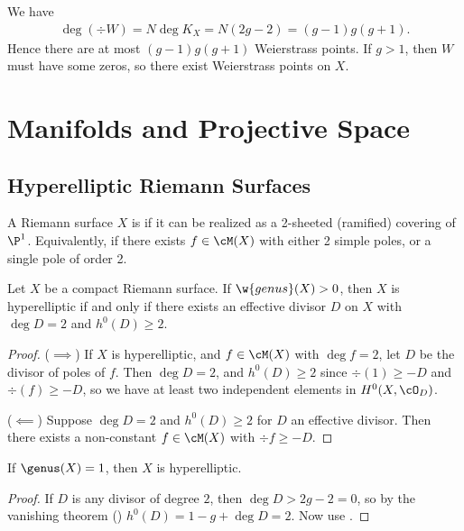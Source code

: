 \documentclass[11pt]{report}
\begin{document}
\begin{rmk} \label{rmk:g-more-1-implies-wp}
We have
\begin{align*}
\deg (\div W)=N\deg K_X = N(2g-2) = (g-1)g(g+1).
\end{align*}
Hence there are at most $(g-1)g(g+1)$ Weierstrass points. If $g>1$, then $W$ must have some zeros, so there exist Weierstrass points on $X$.
\end{rmk}

\chapter{Manifolds and Projective Space}

\section{Hyperelliptic Riemann Surfaces}

\begin{defn}
A Riemann surface $X$ is  if it can be realized as a 2-sheeted (ramified) covering of $\P^1$. Equivalently, if there exists $f \in \cM(X)$ with either 2 simple poles, or a single pole of order 2.
\end{defn}

\begin{prop} \label{prop:pos-genus-hyperelliptic-condition}
Let $X$ be a compact Riemann surface. If $\w{genus}(X)>0$, then $X$ is hyperelliptic if and only if there exists an effective divisor $D$ on $X$ with $\deg D=2$ and $h^0(D)\geq 2$.
\end{prop}

\begin{proof}
($\implies$) If $X$ is hyperelliptic, and $f \in \cM(X)$ with $\deg f =2$, let $D$ be the divisor of poles of $f$. Then $\deg D= 2$, and $h^0(D)\ge 2$ since $\div(1)\ge -D$ and $\div (f) \geq -D$, so we have at least two independent elements in $H^0(X,\cO_D)$.

($\impliedby$) Suppose $\deg D = 2$ and $h^0(D) \ge 2$ for $D$ an effective divisor. Then there exists a non-constant $f \in \cM(X)$ with $\div f \geq -D$.
\end{proof}

\begin{cor}
If $\genus(X)=1$, then $X$ is hyperelliptic.
\end{cor}

\begin{proof}
If $D$ is any divisor of degree $2$, then $\deg D > 2g-2 =0$, so by the vanishing theorem () $h^0(D)=1-g+\deg D=2$. Now use .
\end{proof}
\end{document}
